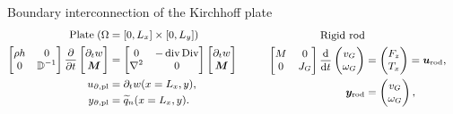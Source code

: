 \documentclass[aspectratio=169]{ISAE-Beamer}
\DeclareMathOperator*{\Div}{Div}
\renewcommand{\div}{\operatorname{div}}
\begin{document}
\begin{frame}{Boundary interconnection of the Kirchhoff plate}
\begin{equation*}\small
\begin{aligned}
\text{Plate} \; (\Omega &= [0, L_x] \times [0, L_y]) \\
\begin{bmatrix}
\rho h & 0 \\ 0 & \mathbb{D}^{-1} \\
\end{bmatrix}
\diffp{}{t}
\begin{bmatrix}
\partial_t w \\ \bm{M} \\
\end{bmatrix} &= 
\begin{bmatrix}
0 & -\div\Div \\ \nabla^2 & 0 \\
\end{bmatrix}
\begin{bmatrix}
\partial_t w \\ \bm{M} \\
\end{bmatrix} \\
u_{\partial, \text{pl}} &= \partial_t w (x = L_x, y), \\
y_{\partial, \text{pl}} &= \widetilde{q}_n(x = L_x, y).
\end{aligned} \qquad \quad
\begin{aligned}
\text{Rigid rod} \\
\begin{bmatrix}
M & 0 \\
0   & J_G \\
\end{bmatrix} 
\displaystyle \diff{}{t}
\begin{pmatrix}
v_G \\ \omega_G \\
\end{pmatrix} & = \begin{pmatrix}
F_z \\ T_x \\
\end{pmatrix} = \bm{u}_{\text{rod}}\vspace{1mm}, \\
\bm{y}_{\text{rod}} &= \begin{pmatrix}
v_G \\ \omega_{G} \\
\end{pmatrix},

\end{aligned}
\end{equation*}
\end{frame}
\end{document}
